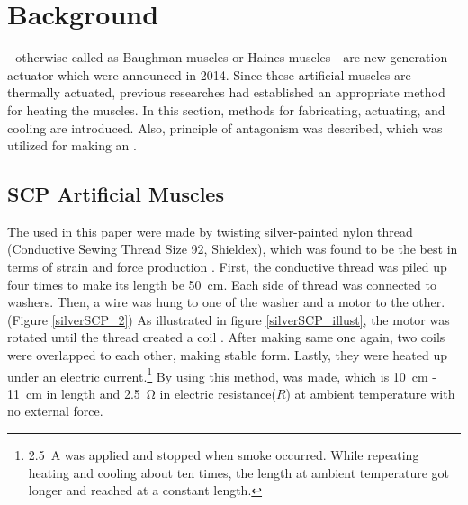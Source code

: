\section{Background} \label{section_background}


\scps - otherwise called as Baughman muscles or Haines muscles - are new-generation actuator which were announced in 2014.
Since these artificial muscles are thermally actuated, previous researches had established an appropriate method for heating the muscles.
In this section, methods for fabricating, actuating, and cooling \scps are introduced.
Also, principle of antagonism was described, which was utilized for making an \antanospace.

\subsection{SCP Artificial Muscles}
The \scps used in this paper were made by twisting silver-painted nylon thread (Conductive Sewing Thread Size 92, Shieldex), which was found to be the best in terms of strain and force production \cite{haines}. First, the conductive thread was piled up four times to make its length be \SI{50}{\centi\meter}. Each side of thread was connected to washers. Then, a wire was hung to one of the washer and a motor to the other. (Figure \ref{silverSCP_2})
As illustrated in figure \ref{silverSCP_illust}, the motor was rotated until the thread created a coil \cite{fab_coil}. After making same one again, two coils were overlapped to each other, making stable form. 
Lastly, they were heated up under an electric current.\footnote{\SI{2.5}{\ampere} was applied and stopped when smoke occurred. While repeating heating and cooling about ten times, the length at ambient temperature got longer and reached at a constant length.} By using this method, \scp was made, which is \SI{10}{\centi\meter} - \SI{11}{\centi\meter} in length and \SI{2.5}{\ohm} in electric resistance($ R $) at ambient temperature with no external force.



